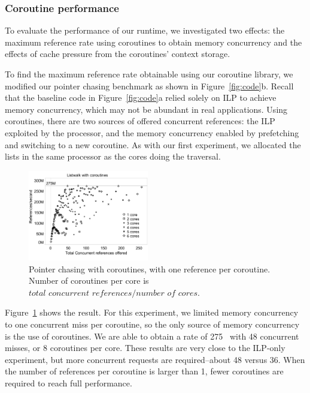 \documentclass[10pt,nocopyrightspace,preprint]{sigplanconf}
\begin{document}
\subsubsection{Coroutine performance}

To evaluate the performance of our runtime, we investigated two
effects: the maximum reference rate using coroutines
to obtain memory concurrency and the effects of cache pressure from the
coroutines' context storage. 

To find the maximum reference rate obtainable using our coroutine
library, we modified our pointer chasing benchmark as shown in
Figure~\ref{fig:code}b. Recall that the baseline code in Figure~\ref{fig:code}a relied solely on ILP to achieve memory concurrency, which may not be abundant in real applications. Using coroutines, there are two sources of offered
concurrent references: the ILP exploited by the processor, and the
memory concurrency enabled by prefetching and switching to a new
coroutine. As with our first experiment, we allocated the lists in the
same processor as the cores doing the traversal. 

\begin{figure}[t]
  \begin{center}
    \includegraphics[width=0.47\textwidth]{figures/multi-green-edited.pdf}
  \end{center}
  \caption{Pointer chasing with coroutines, with one reference per
    coroutine. Number of coroutines per core is $\textit{total concurrent references} / \textit{number of cores}$.}
  \label{fig:multi-green}
\end{figure}

Figure~\ref{fig:multi-green} shows the result. For this
experiment, we limited memory concurrency to one concurrent miss per
coroutine, so the only source of memory concurrency is the use of
coroutines. We are able to obtain a rate of 275 \mrps\ with 48 concurrent misses, or 8 coroutines per core. These
results are very close to the ILP-only experiment, but more concurrent requests are required--about 48 versus 36. When the number of references per coroutine is larger than 1, fewer coroutines are required to reach full performance.
\end{document}
